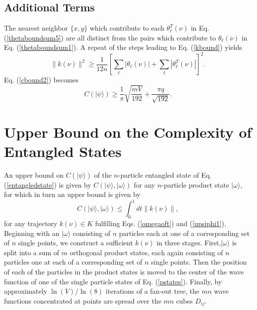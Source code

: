 \documentclass[12pt,amsmath,amssymb,onecolumn]{revtex4-2}
\begin{document}
\subsection{\label{subsec:additional} Additional Terms}

The nearest neighbor $\{x,y\}$ which contribute to each $\theta^T_{\ell}(\nu)$
in Eq. (\ref{thetaboundsum5}) are all distinct from the pairs which
contribute to $\theta_{\ell}(\nu)$
in Eq. (\ref{thetaboundsum1}). A repeat of the steps leading to
Eq. (\ref{kbound}) yields
\begin{equation}
\label{kbound2}
\parallel k(\nu) \parallel^2 \ge
\frac{1}{12 n} [\sum_{\ell} |\theta_{\ell}(\nu)| + \sum_{\ell} |\theta^T_{\ell}(\nu)| ] ^ 2.
\end{equation}
Eq. (\ref{cbound2}) becomes
\begin{equation}
\label{cbound3}
C( |\psi \rangle ) \ge \frac{1}{\pi} \sqrt{ \frac{ mV}{192}} + \frac{\pi q}{ \sqrt{192}}.
\end{equation}




\section{\label{app:upperbound} Upper Bound on the Complexity of Entangled States}


An upper bound on $C( |\psi \rangle )$ of the $n$-particle entangled state of Eq. (\ref{entangledstate}) 
is given by $C( |\psi \rangle , |\omega \rangle )$ for any $n$-particle product state
$|\omega \rangle $, for which in turn an upper bound is given by 
\begin{equation}
\label{cpsiomega}
C( |\psi \rangle , |\omega \rangle ) \le \int_0^1 d t \parallel k( \nu) \parallel,
\end{equation} 
for any 
trajectory $k(\nu) \in K$ fulfilling Eqs. (\ref{omegaoft}) and (\ref{upsiphi1}).
Beginning with an $|\omega \rangle $
consisting of $n$ particles each at one of a corresponding set of
$n$ single points, we construct a sufficient $k(\nu)$ in three stages.
First,$|\omega \rangle $
is split into a sum of $m$ orthogonal product states, each again consisting
of $n$ particles one at each of a corresponding set of $n$ single points. Then the 
position of each of the particles in the product states is moved to the center of
the wave function of one of the single particle states of Eq. (\ref{pstates}). 
Finally, by approximately $\ln( V) / \ln( 8)$ iterations of a
fan-out tree, the $m n$ wave functions concentrated at points are spread over the 
$m n$ cubes $D_{ij}$.
\end{document}
